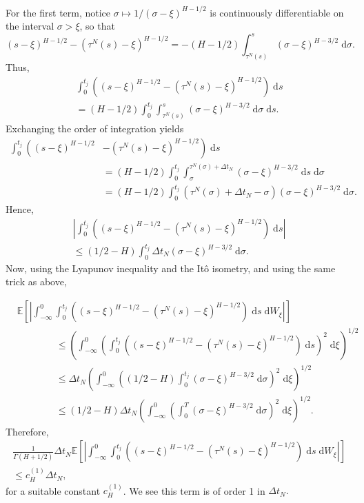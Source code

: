 \documentclass[reqno,12pt]{amsart}
\theoremstyle{plain} %
\theoremstyle{definition} %
\begin{document}
For the first term, notice $\sigma \mapsto 1/(\sigma - \xi)^{H-1/2}$ is continuously differentiable on the interval $\sigma > \xi$, so that
\[
    (s-\xi)^{H-1/2} - (\tau^N(s)-\xi)^{H-1/2} = - (H-1/2)\int_{\tau^N(s)}^s (\sigma - \xi)^{H - 3/2} \;\mathrm{d}\sigma.
\]
Thus,
\begin{multline*}
    \int_{0}^{t_j} \left( (s-\xi)^{H-1/2} - (\tau^N(s)-\xi)^{H-1/2}\right) \;\mathrm{d}s \\
    = (H-1/2)\int_{0}^{t_j} \int_{\tau^N(s)}^s (\sigma - \xi)^{H - 3/2} \;\mathrm{d}\sigma \;\mathrm{d}s.
\end{multline*}
Exchanging the order of integration yields
\begin{align*}
    \int_{0}^{t_j} \left( (s-\xi)^{H-1/2} \right. & \left. - (\tau^N(s)-\xi)^{H-1/2} \right) \;\mathrm{d}s \\
    & = (H-1/2)\int_{0}^{t_j} \int_{\sigma}^{\tau^N(\sigma) + \Delta t_N} (\sigma - \xi)^{H - 3/2} \;\mathrm{d}s \;\mathrm{d}\sigma \\
    & = (H-1/2)\int_{0}^{t_j} \left(\tau^N(\sigma) + \Delta t_N - \sigma\right) (\sigma - \xi)^{H - 3/2} \;\mathrm{d}\sigma.
\end{align*}
Hence,
\begin{multline*}
    \left|\int_{0}^{t_j} \left( (s-\xi)^{H-1/2} - (\tau^N(s)-\xi)^{H-1/2} \right) \;\mathrm{d}s\right| \\
    \leq (1/2 - H)\int_{0}^{t_j} \Delta t_N (\sigma - \xi)^{H - 3/2} \;\mathrm{d}\sigma.
\end{multline*}
Now, using the Lyapunov inequality and the It\^o isometry, and using the same trick as above,

\begin{align*}
    & \mathbb{E}\left[\left|\int_{-\infty}^{0} \int_{0}^{t_j} \left( (s-\xi)^{H-1/2} - (\tau^N(s)-\xi)^{H-1/2}\right) \;\mathrm{d}s \;\mathrm{d}W_\xi \right|\right] \\
    & \qquad\qquad \leq \left(\int_{-\infty}^{0} \left(\int_{0}^{t_j} \left( (s-\xi)^{H-1/2} - (\tau^N(s)-\xi)^{H-1/2}\right) \;\mathrm{d}s \right)^2 \;\mathrm{d}\xi \right)^{1/2} \\
    & \qquad\qquad \leq \Delta t_N \left(\int_{-\infty}^{0} \left( (1/2 - H)\int_0^{t_j} (\sigma - \xi)^{H-3/2} \;\mathrm{d}\sigma \right)^2 \;\mathrm{d}\xi \right)^{1/2} \\
    & \qquad\qquad \leq (1/2 - H)\Delta t_N \left(\int_{-\infty}^{0} \left(\int_0^T (\sigma - \xi)^{H-3/2} \;\mathrm{d}\sigma \right)^2 \;\mathrm{d}\xi \right)^{1/2}.
\end{align*}
Therefore,
\begin{multline}
    \label{firsttermfBm}
    \frac{1}{\Gamma(H + 1/2)}\Delta t_N \mathbb{E}\left[\left|\int_{-\infty}^{0} \int_{0}^{t_j} \left( (s-\xi)^{H-1/2} - (\tau^N(s)-\xi)^{H-1/2}\right) \;\mathrm{d}s \;\mathrm{d}W_\xi \right|\right] \\
    \leq c_H^{(1)}\Delta t_N,
\end{multline}
for a suitable constant $c_H^{(1)}$. We see this term is of order 1 in $\Delta t_N.$
\end{document}
